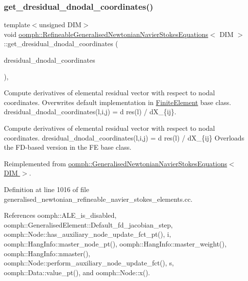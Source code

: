 \subsubsection{\texorpdfstring{get\+\_\+dresidual\+\_\+dnodal\+\_\+coordinates()}{get\_dresidual\_dnodal\_coordinates()}}
{\footnotesize\ttfamily template$<$unsigned D\+IM$>$ \\
void \hyperlink{classoomph_1_1RefineableGeneralisedNewtonianNavierStokesEquations}{oomph\+::\+Refineable\+Generalised\+Newtonian\+Navier\+Stokes\+Equations}$<$ D\+IM $>$\+::get\+\_\+dresidual\+\_\+dnodal\+\_\+coordinates (\begin{DoxyParamCaption}\item[{\hyperlink{classoomph_1_1RankThreeTensor}{Rank\+Three\+Tensor}$<$ double $>$ \&}]{dresidual\+\_\+dnodal\+\_\+coordinates }\end{DoxyParamCaption})\hspace{0.3cm}{\ttfamily [protected]}, {\ttfamily [virtual]}}



Compute derivatives of elemental residual vector with respect to nodal coordinates. Overwrites default implementation in \hyperlink{classoomph_1_1FiniteElement}{Finite\+Element} base class. dresidual\+\_\+dnodal\+\_\+coordinates(l,i,j) = d res(l) / d\+X\+\_\+\{ij\}. 

Compute derivatives of elemental residual vector with respect to nodal coordinates. dresidual\+\_\+dnodal\+\_\+coordinates(l,i,j) = d res(l) / d\+X\+\_\+\{ij\} Overloads the F\+D-\/based version in the FE base class. 

Reimplemented from \hyperlink{classoomph_1_1GeneralisedNewtonianNavierStokesEquations_a2c26367aca1f2c400f69d63786474eb8}{oomph\+::\+Generalised\+Newtonian\+Navier\+Stokes\+Equations$<$ D\+I\+M $>$}.



Definition at line 1016 of file generalised\+\_\+newtonian\+\_\+refineable\+\_\+navier\+\_\+stokes\+\_\+elements.\+cc.



References oomph\+::\+A\+L\+E\+\_\+is\+\_\+disabled, oomph\+::\+Generalised\+Element\+::\+Default\+\_\+fd\+\_\+jacobian\+\_\+step, oomph\+::\+Node\+::has\+\_\+auxiliary\+\_\+node\+\_\+update\+\_\+fct\+\_\+pt(), i, oomph\+::\+Hang\+Info\+::master\+\_\+node\+\_\+pt(), oomph\+::\+Hang\+Info\+::master\+\_\+weight(), oomph\+::\+Hang\+Info\+::nmaster(), oomph\+::\+Node\+::perform\+\_\+auxiliary\+\_\+node\+\_\+update\+\_\+fct(), s, oomph\+::\+Data\+::value\+\_\+pt(), and oomph\+::\+Node\+::x().



